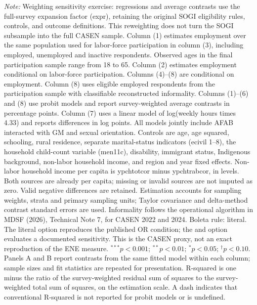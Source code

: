 \begin{table}[htpb!]
\begin{minipage}{\textwidth}
\textit{Note:} Weighting sensitivity exercise: regressions and average contrasts use the full-survey expansion factor (expr), retaining the original SOGI eligibility rules, controls, and outcome definitions. This reweighting does not turn the SOGI subsample into the full CASEN sample. Column (1) estimates employment over the same population used for labor-force participation in column (3), including employed, unemployed and inactive respondents. Observed ages in the final participation sample range from 18 to 65. Column (2) estimates employment conditional on labor-force participation. Columns (4)--(8) are conditional on employment.  Column (8) uses eligible employed respondents from the participation sample with classifiable reconstructed informality. Columns (1)--(6) and (8) use probit models and report survey-weighted average contrasts in percentage points. Column (7) uses a linear model of log(weekly hours times 4.33) and reports differences in log points. All models jointly include AFAB interacted with GM and sexual orientation. Controls are age, age squared, schooling, rural residence, separate marital-status indicators (ecivil 1--8), the household child-count variable (men11c), disability, immigrant status, Indigenous background, non-labor household income, and region and year fixed effects. Non-labor household income per capita is ypchtotcor minus ypchtrabcor, in levels. Both sources are already per capita; missing or invalid sources are not imputed as zero. Valid negative differences are retained. Estimation accounts for sampling weights, strata and primary sampling units; Taylor covariance and delta-method contrast standard errors are used. Informality follows the operational algorithm in MDSF (2026), Technical Note 7, for CASEN 2022 and 2024. Boleta rule: literal. The literal option reproduces the published OR condition; the and option evaluates a documented sensitivity. This is the CASEN proxy, not an exact reproduction of the ENE measure. $^{***}p<0.001$; $^{**}p<0.01$; $^{*}p<0.05$; $^{\dagger}p<0.10$. Panels A and B report contrasts from the same fitted model within each column; sample sizes and fit statistics are repeated for presentation. R-squared is one minus the ratio of the survey-weighted residual sum of squares to the survey-weighted total sum of squares, on the estimation scale. A dash indicates that conventional R-squared is not reported for probit models or is undefined.
\end{minipage}
\end{table}
